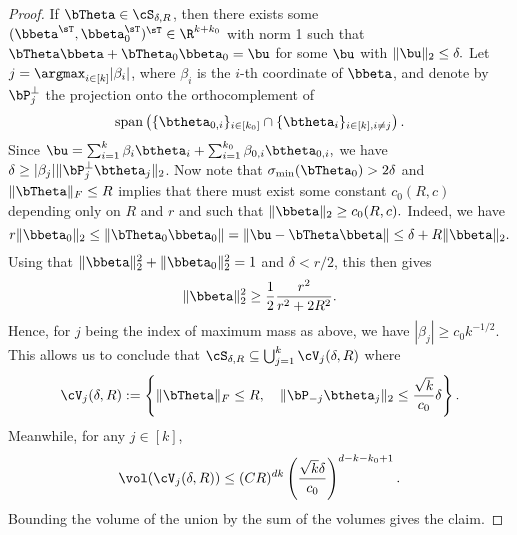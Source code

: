 \begin{proof}
If $\bTheta \in\cS_{\delta,R}$, then there exists some $(\bbeta^\sT,\bbeta_0^\sT)^\sT\in\R^{k+k_0}$ with norm 1 such that $\bTheta\bbeta+\bTheta_0\bbeta_0 = \bu$ for some $\bu$ with $\|\bu\|_2 \le \delta.$
Let $j = \argmax_{i\in[k]} |\beta_i|$, where $\beta_i$ is the $i$-th coordinate of $\bbeta$, and denote by $\bP^\perp_{j}$ the projection onto the orthocomplement of 
\begin{equation}
    \textrm{span}\left(\{\btheta_{0,i}\}_{i\in[k_0]} \cap \{\btheta_{i}\}_{i\in[k], i\neq j} \right).
\end{equation}
Since
$\bu = \sum_{i=1}^k \beta_i \btheta_i + \sum_{i=1}^{k_0} \beta_{0,i} \btheta_{0,i},$
we have $\delta \ge |\beta_j|\|\bP_{j}^\perp \btheta_j\|_2$.
Now note that $\sigma_{\min}(\bTheta_0) > 2\delta$
and $\|\bTheta\|_F \le R$ implies that there must exist some constant $c_0(R,c)$ depending only on $R$ and $r$ and such that $\|\bbeta\|_2 \ge c_0(R,c).$ 
Indeed, we have
\begin{equation}
    r \|\bbeta_0\|_2 \le \|\bTheta_0 \bbeta_0\| = \|\bu - \bTheta\bbeta\| \le \delta + R \|\bbeta\|_2.
\end{equation}
Using that $\|\bbeta\|_2^2 + \|\bbeta_0\|_2^2 = 1$ and $\delta < r/2$, this then gives
\begin{equation}
   \|\bbeta\|_2^2 \ge \frac12\frac{r^2}{r^2 + 2 R^2}.
\end{equation}
Hence, for $j$ being the index of maximum mass as above, we have $|\beta_j| \ge c_0 k^{-1/2}$. This allows us to conclude that
$\cS_{\delta,R} \subseteq \bigcup_{j=1}^k  \cV_{j}(\delta, R)$
where
\begin{equation}
    \cV_{j}(\delta, R) := \left\{\|\bTheta\|_F \le R ,\quad   \|\bP_{-j} \btheta_j\|_2 \le \frac{\sqrt{k}}{c_0} \delta\right\}.
\end{equation}
Meanwhile, for any $j \in[k]$,
\begin{equation}
    \vol( \cV_j(\delta,R)) \le  (C R)^{dk} \left(\frac{\sqrt{k} \delta}{c_0}\right)^{d - k - k_0+1}.
\end{equation}
Bounding the volume of the union by the sum of the volumes gives the claim.

\end{proof}


